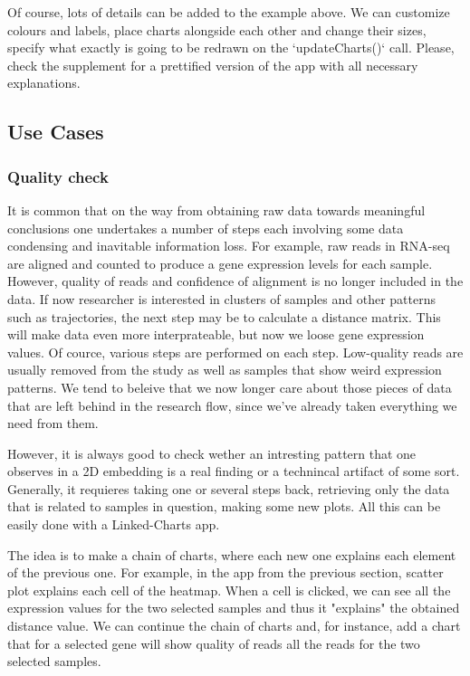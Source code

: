 \documentclass[twocolumn,10pt]{article}
\begin{document}
Of course, lots of details can be added to the example above. We can customize colours and labels, place charts alongside each other and change their sizes, specify what exactly is going to be redrawn on the `updateCharts()` call. Please, check the supplement for a prettified version of the app with all necessary explanations.

\subsection{Use Cases}
\subsubsection{Quality check}
It is common that on the way from obtaining raw data towards meaningful conclusions one undertakes a number of steps each involving some data condensing and inavitable information loss. For example, raw reads in RNA-seq are aligned and counted to produce a gene expression levels for each sample. However, quality of reads and confidence of alignment is no longer included in the data. If now researcher is interested in clusters of samples and other patterns such as trajectories, the next step may be to calculate a distance matrix. This will make data even more interprateable, but now we loose gene expression values. Of cource, various steps are performed on each step. Low-quality reads are usually removed from the study as well as samples that show weird expression patterns. We tend to beleive that we now longer care about those pieces of data that are left behind in the research flow, since we've already taken everything we need from them.

However, it is always good to check wether an intresting pattern that one observes in a 2D embedding is a real finding or a technincal artifact of some sort. Generally, it requieres taking one or several steps back, retrieving only the data that is related to samples in question, making some new plots. All this can be easily done with a Linked-Charts app.

The idea is to make a chain of charts, where each new one explains each element of the previous one. For example, in the app from the previous section, scatter plot explains each cell of the heatmap. When a cell is clicked, we can see all the expression values for the two selected samples and thus it "explains" the obtained distance value. We can continue the chain of charts and, for instance, add a chart that for a selected gene will show quality of reads all the reads for the two selected samples.
\end{document}
